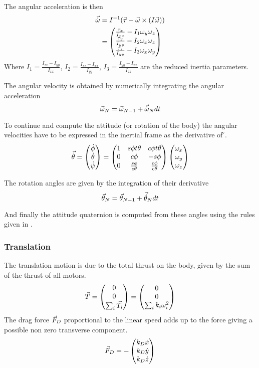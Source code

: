 The angular acceleration is then
\begin{align}
	\vec{\dot{\omega}} &= I^{-1}(\vec{\tau} - \vec{\omega}\times(I\vec{\omega})) \\
	&= \begin{pmatrix}
		\frac{\tau_x}{I_{xx}} - I_1\omega_y\omega_z\\
		\frac{\tau_y}{I_{yy}} - I_2\omega_x\omega_z\\
		\frac{\tau_z}{I_{yy}} - I_3\omega_x\omega_y
	\end{pmatrix}
\end{align}
Where $I_1 = \frac{I_{zz}-I_{yy}}{I_{xx}}$, $I_2 = \frac{I_{zz}-I_{xx}}{I_{yy}}$, $I_3 = \frac{I_{yy}-I_{xx}}{I_{zz}}$
are the reduced inertia parameters.

The angular velocity is obtained by numerically integrating the angular acceleration
\begin{equation}
	\vec{\omega}_N = \vec{\omega}_{N-1} + \vec{\dot{\omega}}_N dt
\end{equation} 

To continue and compute the attitude (or rotation of the body) the angular velocities have to be expressed in the
inertial frame as the derivative of \v{\theta}.
\begin{equation}
	\vec{\dot{\theta}} = \begin{pmatrix}\dot{\phi}\\\dot{\theta}\\\dot{\psi}\end{pmatrix} = \begin{pmatrix}
		1 & s\phi t\theta & c\phi t\theta\\
		0 & c\phi & -s\phi\\ 
		0 & \frac{s\phi}{c\theta} & \frac{c\phi}{c\theta}
	\end{pmatrix}\begin{pmatrix}\omega_x\\\omega_y\\\omega_z\end{pmatrix}
\end{equation}

The rotation angles are given by the integration of their derivative
\begin{equation}
	\vec{\theta}_N = \vec{\theta}_{N-1} + \vec{\dot{\theta}}_N dt
\end{equation}

And finally the attitude quaternion  is computed from these angles using the rules given in .  

\subsubsection{Translation}
The translation motion is due to the total thrust on the body, given
by the sum of the thrust of all motors. 
\begin{equation}\labeleq{bodyThrust}
	\v{T} = \matrix{0\\0\\\sum_{i}{\v{T_i}}} = \matrix{0\\0\\\sum_{i}{k_i\om^2}}
\end{equation}
The drag force $\vec{F}_D$ proportional to the linear speed adds up to the force giving a possible non zero transverse
component.
\begin{equation}
	\vec{F}_D = -\begin{pmatrix}k_D\dot{x}\\k_D\dot{y}\\k_D\dot{z}\end{pmatrix}
\end{equation}

